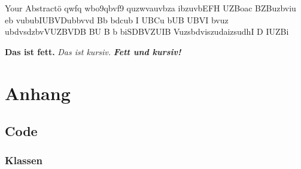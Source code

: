 \documentclass[12pt,a4paper]{article}
\begin{document}
Your Abstractö qwfq wbo9qbvf9 quzwvauvbza ibzuvbEFH UZBoac BZBuzbviu eb vububIUBVDubbvvd Bb bdcub I UBCu bUB UBVI bvuz ubdvsdzbvVUZBVDB BU B b  biSDBVZUIB VuzsbdviszudaizsudhI D IUZBi


\textbf{Das ist fett.}
\textit{Das ist kursiv.}
\textbf{\textit{Fett und kursiv!}}

\subsection{}
\newpage

\section{Anhang}
\subsection{Code}
\subsubsection{Klassen}
\end{document}

